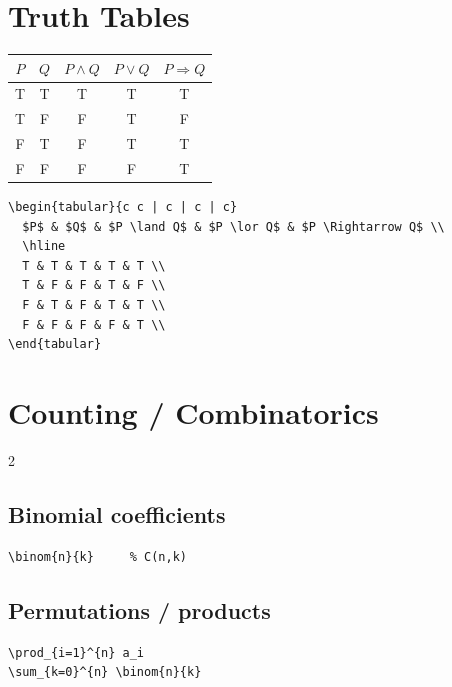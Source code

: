 \documentclass[11pt]{article}
\begin{document}
\section{Truth Tables}

\begin{center}
\begin{tabular}{c c | c | c | c}
  $P$ & $Q$ & $P \land Q$ & $P \lor Q$ & $P \Rightarrow Q$ \\
  \hline
  T & T & T & T & T \\
  T & F & F & T & F \\
  F & T & F & T & T \\
  F & F & F & F & T \\
\end{tabular}
\end{center}

\begin{lstlisting}
\begin{tabular}{c c | c | c | c}
  $P$ & $Q$ & $P \land Q$ & $P \lor Q$ & $P \Rightarrow Q$ \\
  \hline
  T & T & T & T & T \\
  T & F & F & T & F \\
  F & T & F & T & T \\
  F & F & F & F & T \\
\end{tabular}
\end{lstlisting}

\section{Counting / Combinatorics}

\begin{multicols}{2}
\subsection*{Binomial coefficients}
\begin{lstlisting}
\binom{n}{k}     % C(n,k)
\end{lstlisting}

\subsection*{Permutations / products}
\begin{lstlisting}
\prod_{i=1}^{n} a_i
\sum_{k=0}^{n} \binom{n}{k}
\end{lstlisting}
\end{multicols}
\end{document}
